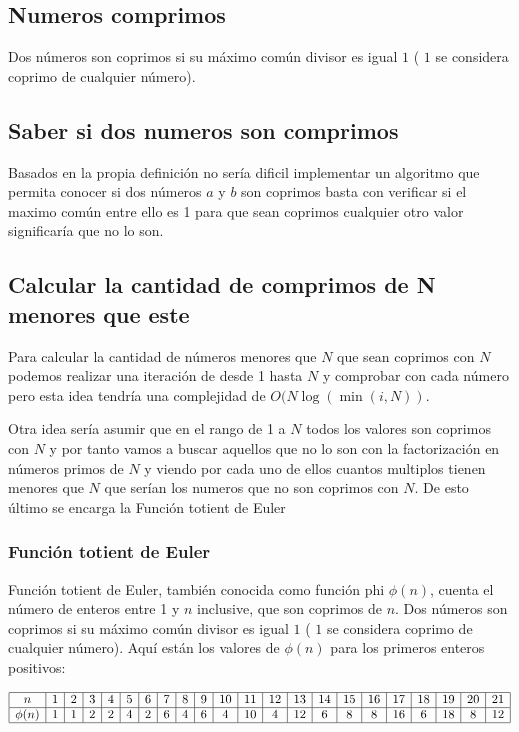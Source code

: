 \subsection{Numeros comprimos}

Dos números son coprimos si su máximo común divisor es igual $1$ ( $1$ se considera coprimo de cualquier número).

\subsection{Saber si dos numeros son comprimos}

Basados en la propia definición no sería dificil implementar un algoritmo que permita conocer si dos números $a$ y $b$ son coprimos basta con verificar si el maximo común entre ello es 1 para que sean coprimos cualquier otro valor significaría que no lo son. 

\subsection{Calcular la cantidad de comprimos de N menores que este}

Para calcular la cantidad de números menores que $N$ que sean coprimos con $N$ podemos realizar una iteración de desde 1 hasta $N$ y comprobar con cada número pero esta idea tendría una complejidad de $O(N\log(\min(i,N))$.

Otra idea sería asumir que en el rango de 1 a $N$ todos los valores son coprimos con $N$ y por tanto vamos a buscar aquellos que no lo son con la factorización en números primos de $N$ y viendo por cada uno de ellos cuantos multiplos tienen menores que $N$ que serían los numeros que no son coprimos con $N$. De esto último se encarga la Función totient de Euler

\subsubsection{Función totient de Euler}


Función totient de Euler, también conocida como función phi $\phi(n)$, cuenta el 
número de enteros entre 1 y $n$ inclusive, que son coprimos de $n$. Dos números 
son coprimos si su máximo común divisor es igual $1$ ( $1$ se considera coprimo 
de cualquier número). Aquí están los valores de $\phi(n)$ para los primeros 
enteros positivos:


$
\begin{array}{|c|c|c|c|c|c|c|c|c|c|c|c|c|c|c|c|c|c|c|c|c|c|}
	\hline
	n & 1 & 2 & 3 & 4 & 5 & 6 & 7 & 8 & 9 & 10 & 11 & 12 & 13 & 14 & 15 & 16 & 17 & 18 & 19 & 20 & 21 \\ \hline
	\phi(n) & 1 & 1 & 2 & 2 & 4 & 2 & 6 & 4 & 6 & 4 & 10 & 4 & 12 & 6 & 8 & 8 & 16 & 6 & 18 & 8 & 12 \\ \hline
\end{array}
$

